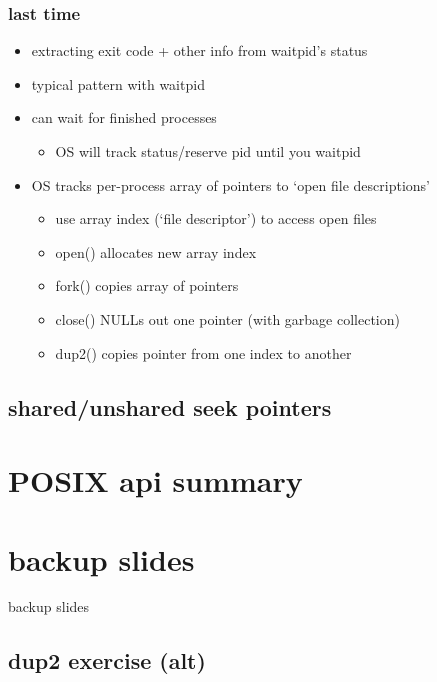 \date{}
\title{}
\date{}

\begin{frame}
    \titlepage
\end{frame}



\begin{frame}
\frametitle{last time}
    \begin{itemize}
        \item extracting exit code + other info from waitpid's status
        \item typical pattern with waitpid
        \item can wait for finished processes
            \begin{itemize}
            \item OS will track status/reserve pid until you waitpid
            \end{itemize}
        \item OS tracks per-process array of pointers to `open file descriptions'
            \begin{itemize}
            \item use array index (`file descriptor') to access open files
            \item open() allocates new array index
            \item fork() copies array of pointers
            \item close() NULLs out one pointer (with garbage collection)
            \item dup2() copies pointer from one index to another
            \end{itemize}
    \end{itemize}
\end{frame}

\subsection{shared/unshared seek pointers}


\section{POSIX api summary}





\section{backup slides}
\begin{frame}{backup slides}
\end{frame}

\subsection{dup2 exercise (alt)}



